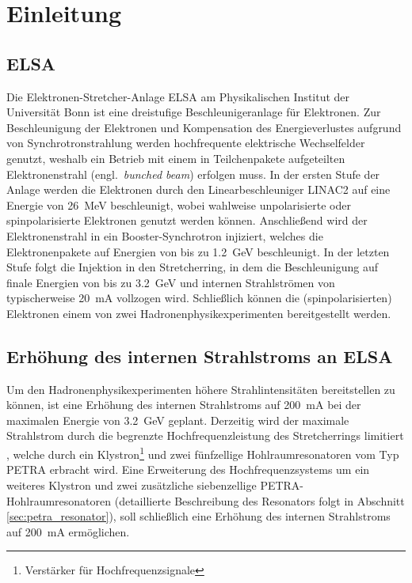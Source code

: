 \chapter{Einleitung}
\label{sec:einleitung}

\section{ELSA}
Die Elektronen-Stretcher-Anlage ELSA am Physikalischen Institut der Universität Bonn ist eine dreistufige Beschleunigeranlage für Elektronen.
Zur Beschleunigung der Elektronen und Kompensation des Energieverlustes aufgrund von Synchrotronstrahlung werden hochfrequente elektrische Wechselfelder genutzt, weshalb ein Betrieb mit einem in Teilchenpakete aufgeteilten Elektronenstrahl (engl.\ \textit{bunched beam}) erfolgen muss.
In der ersten Stufe der Anlage werden die Elektronen durch den Linearbeschleuniger LINAC2 auf eine Energie von \SI{26}{MeV} beschleunigt, wobei wahlweise unpolarisierte oder spinpolarisierte Elektronen genutzt werden können.
Anschließend wird der Elektronenstrahl in ein Booster-Synchrotron injiziert, welches die Elektronenpakete auf Energien von bis zu \SI{1.2}{GeV} beschleunigt.
In der letzten Stufe folgt die Injektion in den Stretcherring, in dem die Beschleunigung auf finale Energien von bis zu \SI{3.2}{GeV} und internen Strahlströmen von typischerweise \SI{20}{mA} vollzogen wird.
Schließlich können die (spinpolarisierten) Elektronen einem von zwei Hadronenphysikexperimenten bereitgestellt werden.


\section{Erhöhung des internen Strahlstroms an ELSA}
Um den Hadronenphysikexperimenten höhere Strahlintensitäten bereitstellen zu können, ist eine Erhöhung des internen Strahlstroms auf \SI{200}{mA} bei der maximalen Energie von \SI{3.2}{GeV} geplant.
Derzeitig wird der maximale Strahlstrom durch die begrenzte Hochfrequenzleistung des Stretcherrings limitiert \cite{schedler}, welche durch ein Klystron\footnote{Verstärker für Hochfrequenzsignale} und zwei fünfzellige Hohlraumresonatoren vom Typ PETRA erbracht wird.
Eine Erweiterung des Hochfrequenzsystems um ein weiteres Klystron und zwei zusätzliche siebenzellige PETRA-Hohlraumresonatoren (detaillierte Beschreibung des Resonators folgt in Abschnitt \ref{sec:petra_resonator}), soll schließlich eine Erhöhung des internen Strahlstroms auf \SI{200}{mA} ermöglichen.

